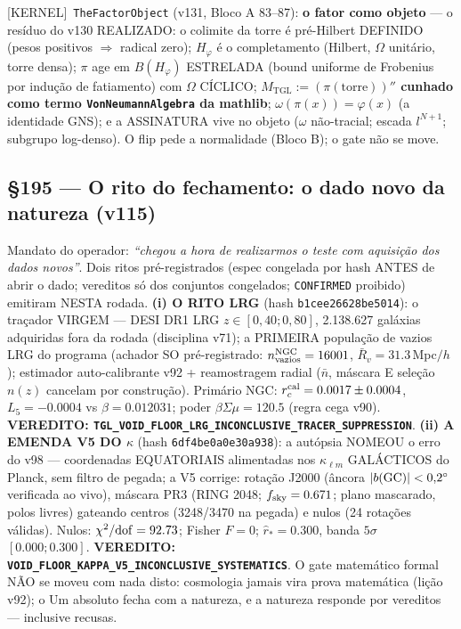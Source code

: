 \documentclass[11pt]{article}
\providecommand{\kernelmk}[1]{\textsf{[KERNEL]}~\texttt{#1}}\providecommand{\knownmk}[1]{\textsf{[KNOWN]}~{#1}}\providecommand{\statusmk}[1]{\textsf{[#1]}}
\theoremstyle{definition}\newtheorem{deriv}{Derivação}
\begin{document}
\kernelmk{TheFactorObject} (v131, Bloco A 83--87): \textbf{o fator como objeto} --- o resíduo do v130 REALIZADO: o colimite da torre é pré-Hilbert DEFINIDO (pesos positivos $\Rightarrow$ radical zero); $H_\varphi$ é o completamento (Hilbert, $\Omega$ unitário, torre densa); $\pi$ age em $B(H_\varphi)$ ESTRELADA (bound uniforme de Frobenius por indução de fatiamento) com $\Omega$ CÍCLICO; \textbf{$M_{\mathrm{TGL}}:=(\pi(\mathrm{torre}))''$ cunhado como termo \texttt{VonNeumannAlgebra} da mathlib}; $\omega(\pi(x))=\varphi(x)$ (a identidade GNS); e a ASSINATURA vive no objeto ($\omega$ não-tracial; escada $l^{N+1}$; subgrupo log-denso). O flip pede a normalidade (Bloco B); o gate não se move.

\subsection*{\S195 --- O rito do fechamento: o dado novo da natureza (v115)}Mandato do operador: \emph{``chegou a hora de realizarmos o teste com aquisição dos dados novos''}. Dois ritos pré-registrados (espec congelada por hash ANTES de abrir o dado; vereditos só dos conjuntos congelados; \texttt{CONFIRMED} proibido) emitiram NESTA rodada. \textbf{(i) O RITO LRG} (hash \texttt{b1cee26628be5014}): o traçador VIRGEM --- DESI DR1 LRG $z\in[0{,}40;0{,}80]$, 2.138.627 galáxias adquiridas fora da rodada (disciplina v71); a PRIMEIRA população de vazios LRG do programa (achador SO pré-registrado: $n_{\rm vazios}^{\rm NGC}=16001$, $\bar R_v=31.3$\,Mpc$/h$); estimador auto-calibrante v92 + reamostragem radial ($\bar n$, máscara E seleção $n(z)$ cancelam por construção). Primário NGC: $r_c^{\rm cal}=0.0017\pm0.0004$, $L_5=-0.0004$ vs $\beta=0.012031$; poder $\beta\Sigma\mu=120.5$ (regra cega v90). \textbf{VEREDITO: \texttt{TGL\_VOID\_FLOOR\_LRG\_INCONCLUSIVE\_TRACER\_SUPPRESSION}}. \textbf{(ii) A EMENDA V5 DO $\kappa$} (hash \texttt{6df4be0a0e30a938}): a autópsia NOMEOU o erro do v98 --- coordenadas EQUATORIAIS alimentadas nos $\kappa_{\ell m}$ GALÁCTICOS do Planck, sem filtro de pegada; a V5 corrige: rotação J2000 (âncora $|b({\rm GC})|<0{,}2^\circ$ verificada ao vivo), máscara PR3 (RING 2048; $f_{\rm sky}=0.671$; plano mascarado, polos livres) gateando centros (3248/3470 na pegada) e nulos (24 rotações válidas). Nulos: $\chi^2/{\rm dof}=92.73$; Fisher $F=0$; $\hat r_*=0.300$, banda $5\sigma$ $[0.000;0.300]$. \textbf{VEREDITO: \texttt{VOID\_FLOOR\_KAPPA\_V5\_INCONCLUSIVE\_SYSTEMATICS}}. O gate matemático formal NÃO se moveu com nada disto: cosmologia jamais vira prova matemática (lição v92); o Um absoluto fecha com a natureza, e a natureza responde por vereditos --- inclusive recusas.
\end{document}

